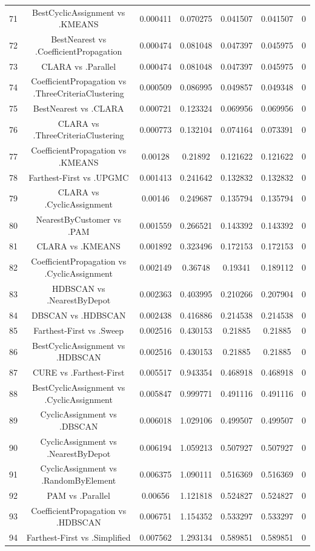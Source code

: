 \documentclass[a4paper,10pt]{article}
\begin{document}
\begin{landscape}
\begin{table}[!htp]
\begin{tabular}{ccccccc}
71&BestCyclicAssignment vs .KMEANS&0.000411&0.070275&0.041507&0.041507&0\\
72&BestNearest vs .CoefficientPropagation&0.000474&0.081048&0.047397&0.045975&0\\
73&CLARA vs .Parallel&0.000474&0.081048&0.047397&0.045975&0\\
74&CoefficientPropagation vs .ThreeCriteriaClustering&0.000509&0.086995&0.049857&0.049348&0\\
75&BestNearest vs .CLARA&0.000721&0.123324&0.069956&0.069956&0\\
76&CLARA vs .ThreeCriteriaClustering&0.000773&0.132104&0.074164&0.073391&0\\
77&CoefficientPropagation vs .KMEANS&0.00128&0.21892&0.121622&0.121622&0\\
78&Farthest-First vs .UPGMC&0.001413&0.241642&0.132832&0.132832&0\\
79&CLARA vs .CyclicAssignment&0.00146&0.249687&0.135794&0.135794&0\\
80&NearestByCustomer vs .PAM&0.001559&0.266521&0.143392&0.143392&0\\
81&CLARA vs .KMEANS&0.001892&0.323496&0.172153&0.172153&0\\
82&CoefficientPropagation vs .CyclicAssignment&0.002149&0.36748&0.19341&0.189112&0\\
83&HDBSCAN vs .NearestByDepot&0.002363&0.403995&0.210266&0.207904&0\\
84&DBSCAN vs .HDBSCAN&0.002438&0.416886&0.214538&0.214538&0\\
85&Farthest-First vs .Sweep&0.002516&0.430153&0.21885&0.21885&0\\
86&BestCyclicAssignment vs .HDBSCAN&0.002516&0.430153&0.21885&0.21885&0\\
87&CURE vs .Farthest-First&0.005517&0.943354&0.468918&0.468918&0\\
88&BestCyclicAssignment vs .CyclicAssignment&0.005847&0.999771&0.491116&0.491116&0\\
89&CyclicAssignment vs .DBSCAN&0.006018&1.029106&0.499507&0.499507&0\\
90&CyclicAssignment vs .NearestByDepot&0.006194&1.059213&0.507927&0.507927&0\\
91&CyclicAssignment vs .RandomByElement&0.006375&1.090111&0.516369&0.516369&0\\
92&PAM vs .Parallel&0.00656&1.121818&0.524827&0.524827&0\\
93&CoefficientPropagation vs .HDBSCAN&0.006751&1.154352&0.533297&0.533297&0\\
94&Farthest-First vs .Simplified&0.007562&1.293134&0.589851&0.589851&0\\

\end{tabular}
\end{table}
\end{landscape}
\end{document}
